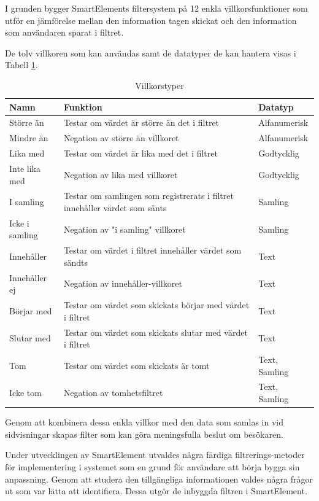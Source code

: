I grunden bygger SmartElements filtersystem på 12 enkla villkorsfunktioner som utför en jämförelse mellan den information tagen skickat och den information som användaren sparat i filtret.

De tolv villkoren som kan användas samt de datatyper de kan hantera visas i Tabell \ref{table:villkor}.

\begin{table}
    \begin{tabular}{|l|p{8cm}|l|}
    \hline
    Namn & Funktion & Datatyp \\
    \hline
    Större än & Testar om värdet är större än det i filtret & Alfanumerisk \\
    \hline
    Mindre än & Negation av större än villkoret & Alfanumerisk \\
    \hline
    Lika med & Testar om värdet är lika med det i filtret & Godtycklig \\
    \hline
    Inte lika med & Negation av lika med villkoret & Godtycklig \\
    \hline
    I samling & Testar om samlingen som registrerats i filtret innehåller värdet som sänts & Samling \\
    \hline
    Icke i samling & Negation av "i samling" villkoret & Samling \\
    \hline
    Innehåller & Testar om värdet i filtret innehåller värdet som sändts & Text \\
    \hline
    Innehåller ej & Negation av innehåller-villkoret & Text \\
    \hline
    Börjar med & Testar om värdet som skickats börjar med värdet i filtret & Text \\
    \hline
    Slutar med & Testar om värdet som skickats slutar med värdet i filtret & Text \\
    \hline
    Tom & Testar om värdet som skickats är tomt & Text, Samling \\
    \hline
    Icke tom & Negation av tomhetsfiltret & Text, Samling \\
    \hline
    \end{tabular}
    \caption{Villkorstyper}
    \label{table:villkor}
\end{table}

Genom att kombinera dessa enkla villkor med den data som samlas in vid sidvisningar skapas filter som kan göra meningsfulla beslut om besökaren.

Under utvecklingen av SmartElement utvaldes några färdiga filtrerings-metoder för implementering i systemet som en grund för användare att börja bygga sin anpassning. Genom att studera den tillgängliga informationen valdes några frågor ut som var lätta att identifiera. Dessa utgör de inbyggda filtren i SmartElement.

